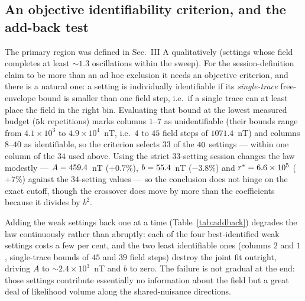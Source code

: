 \documentclass[aps,pra,twocolumn,superscriptaddress,nofootinbib]{revtex4-2}
\begin{document}
\subsection{An objective identifiability criterion, and the add-back test}

The primary region was defined in Sec.~III A qualitatively (settings whose field completes
at least $\sim\!1.3$ oscillations within the sweep). For the session-definition claim to be
more than an ad hoc exclusion it needs an objective criterion, and there is a natural one:
a setting is individually identifiable if its \emph{single-trace} free-envelope bound is
smaller than one field step, i.e.\ if a single trace can at least place the field in the
right bin. Evaluating that bound at the lowest measured budget
($5$k repetitions) marks columns $1$--$7$ as unidentifiable
(their bounds range from $4.1\times10^{3}$ to $4.9\times10^{4}$~nT, i.e.\ $4$ to $45$ field
steps of $1071.4$~nT) and columns $8$--$40$ as identifiable, so the criterion selects $33$ of
the $40$ settings --- within one column of the $34$ used above. Using the strict
$33$-setting session changes the law modestly --- $A=459.4$~nT ($+0.7\%$),
$b=55.4$~nT ($-3.8\%$) and $r^{*}=6.6\times10^{5}$ ($+7\%$) against the
$34$-setting values --- so the conclusion does not hinge on the exact cutoff, though the
crossover does move by more than the coefficients because it divides by $b^{2}$.

Adding the weak settings back one at a time (Table~\ref{tab:addback}) degrades the law
continuously rather than abruptly: each of the four best-identified weak settings costs a
few per cent, and the two least identifiable ones (columns $2$ and $1$, single-trace bounds of $45$ and
$39$ field steps) destroy the joint fit outright, driving $A$ to
$\sim\!2.4\times10^{3}$~nT and $b$ to zero. The failure is not gradual at the end: those
settings contribute essentially no information about the field but a great deal of
likelihood volume along the shared-nuisance directions.
\end{document}
